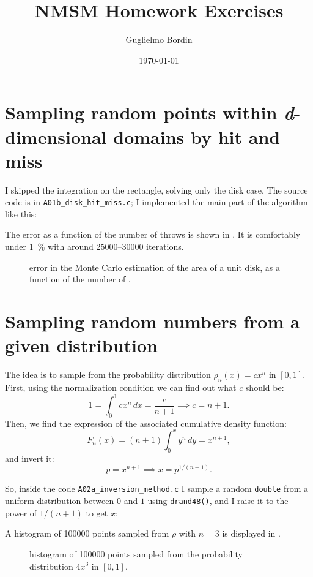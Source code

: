 \documentclass{gulartcl}
\title{NMSM Homework Exercises}
\author{Guglielmo Bordin}
\date{\today}
\begin{document}
\maketitle
\section{Sampling random points within \emph{d}-dimensional domains by hit and
miss}
I skipped the integration on the rectangle, solving only the disk case.  The
source code is in \texttt{A01b\_disk\_hit\_miss.c}; I implemented the main part
of the algorithm like this:



The error as a function of the number of throws is shown in .
It is comfortably under \qty{1}{\percent} with around \numrange{25000}{30000}
iterations.

\begin{figure}
    \centering
    
    \caption{error in the Monte Carlo estimation of the area of a unit
        disk, as a function of the number of .}
    \label{fig:A01b}
\end{figure}

\section{Sampling random numbers from a given distribution}
The idea is to sample from the probability distribution $\rho_n(x) = c x^n$ in
$[0, 1]$.  First, using the normalization condition we can find out what $c$
should be:
\begin{equation}
    1 = \int_{0}^{1} cx^n \, dx = \frac{c}{n + 1} \implies c = n + 1.
\end{equation}
Then, we find the expression of the associated cumulative density function:
\begin{equation}
    F_n(x) = (n + 1) \int_{0}^{x} y^n \, dy = x^{n + 1},
\end{equation}
and invert it:
\begin{equation}
    p = x^{n + 1} \implies x = p^{1 / (n + 1)}.
\end{equation}

So, inside the code \texttt{A02a\_inversion\_method.c} I sample a random
\texttt{double} from a uniform distribution between $0$ and $1$ using
\texttt{drand48()}, and I raise it to the power of $1 / (n + 1)$ to get $x$:



A histogram of \num{100000} points sampled from $\rho$ with $n = 3$ is displayed
in .

\begin{figure}
    \centering
    
    \caption{histogram of \num{100000} points sampled from the probability
        distribution $4 x^3$ in $[0, 1]$.}
    \label{fig:A02a_3}
\end{figure}
\end{document}
